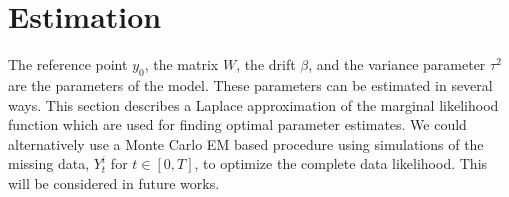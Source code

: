 \documentclass[runningheads,a4paper]{llncs}
\newcommand{\M}{\mathcal{M}}
\begin{document}

\section{Estimation}
\label{sec:Est}

The reference point $y_0$, the matrix $W$, the drift $\beta$, and the variance parameter $\tau^2$ are the parameters of the model.
 These parameters can be estimated in several ways. This section describes a Laplace approximation of the marginal likelihood function which are used for finding optimal parameter estimates. We could alternatively use a Monte Carlo EM based procedure using simulations of the missing data, $Y_t^i$ for $t\in [0,T]$, to optimize the complete data likelihood. This will be considered in future works.
\end{document}
